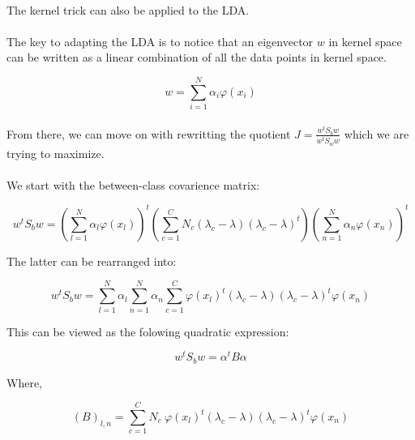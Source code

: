\paragraph{}
The kernel trick can also be applied to the LDA.

\paragraph{}
The key to adapting the LDA is to notice that an eigenvector $w$ in kernel space can be written as a
linear combination of all the data points in kernel space.

\begin{equation}
\label{eq:phibase}
w = \sum_{i=1}^N \alpha_i \varphi(x_i)
\end{equation}

\paragraph{}
From there, we can move on with rewritting the quotient $J = \frac{w^tS_bw}{w^tS_ww}$ which we are
trying to maximize.

\paragraph{}
We start with the between-class covarience matrix:

\begin{equation*}
w^tS_bw = \left( \sum_{l=1}^N \alpha_l \varphi(x_l)\right)^t
            \left( \sum_{c=1}^C N_c(\lambda_c - \lambda)(\lambda_c - \lambda)^t\right)
            \left( \sum_{n=1}^N \alpha_n \varphi(x_n)\right)^t 
\end{equation*}

The latter can be rearranged into:

\begin{equation*}
w^tS_bw = \sum_{l=1}^N\alpha_l \sum_{n=1}^N \alpha_n \sum_{c =1}^C
                \varphi(x_l)^t(\lambda_c - \lambda)(\lambda_c - \lambda)^t\varphi(x_n)
\end{equation*}

This can be viewed as the folowing quadratic expression:

\begin{equation*}
w^tS_bw = \alpha^tB\alpha
\end{equation*}

Where,

\begin{equation*}
(B)_{l,n} = \sum_{c=1}^C N_c ~\varphi(x_l)^t (\lambda_c - \lambda)(\lambda_c -\lambda)^t
\varphi(x_n)
\end{equation*}

